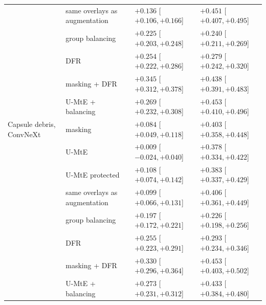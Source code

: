 {\begin{longtable}{p{3.4cm}p{4.2cm}p{3.5cm}p{3.5cm}}
 & same overlays as augmentation & $+0.136$ [$+0.106, +0.166$] & $+0.451$ [$+0.407, +0.495$] \\
 & group balancing & $+0.225$ [$+0.203, +0.248$] & $+0.240$ [$+0.211, +0.269$] \\
 & DFR & $+0.254$ [$+0.222, +0.286$] & $+0.279$ [$+0.242, +0.320$] \\
 & masking + DFR & $+0.345$ [$+0.312, +0.378$] & $+0.438$ [$+0.391, +0.483$] \\
 & U-MtE + balancing & $+0.269$ [$+0.232, +0.308$] & $+0.453$ [$+0.410, +0.496$] \\
Capsule debris, ConvNeXt & masking & $+0.084$ [$+0.049, +0.118$] & $+0.403$ [$+0.358, +0.448$] \\
 & U-MtE & $+0.009$ [$-0.024, +0.040$] & $+0.378$ [$+0.334, +0.422$] \\
 & U-MtE protected & $+0.108$ [$+0.074, +0.142$] & $+0.383$ [$+0.337, +0.429$] \\
 & same overlays as augmentation & $+0.099$ [$+0.066, +0.131$] & $+0.406$ [$+0.361, +0.449$] \\
 & group balancing & $+0.197$ [$+0.172, +0.221$] & $+0.226$ [$+0.198, +0.256$] \\
 & DFR & $+0.255$ [$+0.223, +0.291$] & $+0.293$ [$+0.234, +0.346$] \\
 & masking + DFR & $+0.330$ [$+0.296, +0.364$] & $+0.453$ [$+0.403, +0.502$] \\
 & U-MtE + balancing & $+0.273$ [$+0.231, +0.312$] & $+0.433$ [$+0.384, +0.480$] \\
\end{longtable}}
